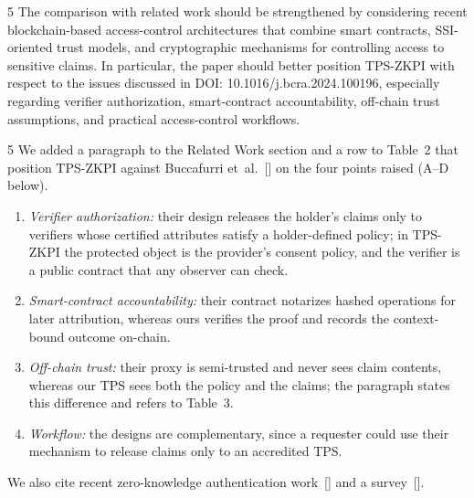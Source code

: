 \begin{reviewcomment}{5}
	The comparison with related work should be strengthened by considering recent blockchain-based access-control architectures that combine smart contracts, SSI-oriented trust models, and cryptographic mechanisms for controlling access to sensitive claims.
	In particular, the paper should better position TPS-ZKPI with respect to the issues discussed in DOI: 10.1016/j.bcra.2024.100196, especially regarding verifier authorization, smart-contract accountability, off-chain trust assumptions, and practical access-control workflows.
\end{reviewcomment}

\begin{reviewresponse}{5}
	We added a paragraph to the Related Work section and a row to Table~2 that position TPS-ZKPI against Buccafurri et~al.~[] on the four points raised (A--D below).
	\begin{enumerate}[label=(\Alph*)]
		\item \emph{Verifier authorization:} their design releases the holder's claims only to verifiers whose certified attributes satisfy a holder-defined policy; in TPS-ZKPI the protected object is the provider's consent policy, and the verifier is a public contract that any observer can check.
		\item \emph{Smart-contract accountability:} their contract notarizes hashed operations for later attribution, whereas ours verifies the proof and records the context-bound outcome on-chain.
		\item \emph{Off-chain trust:} their proxy is semi-trusted and never sees claim contents, whereas our TPS sees both the policy and the claims; the paragraph states this difference and refers to Table~3.
		\item \emph{Workflow:} the designs are complementary, since a requester could use their mechanism to release claims only to an accredited TPS.
	\end{enumerate}
	We also cite recent zero-knowledge authentication work~[] and a survey~[].

\end{reviewresponse}
